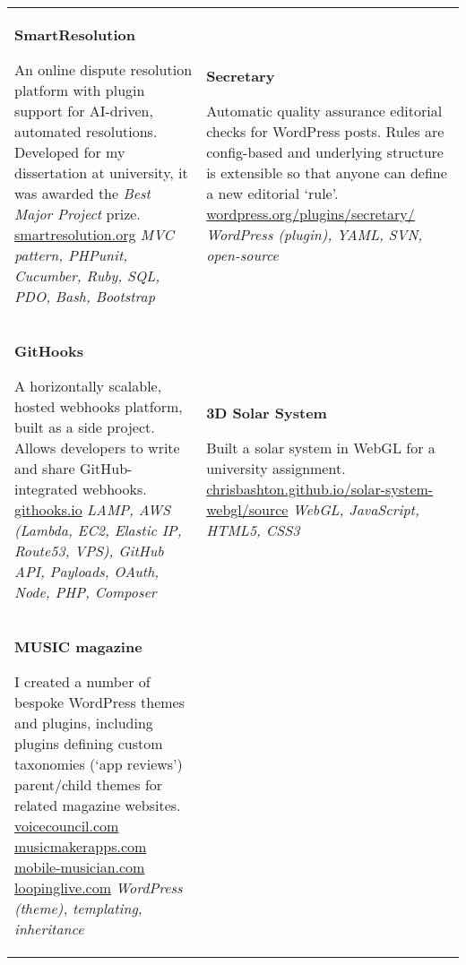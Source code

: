 \begin{tabular}{ p{21.4em} p{21.3em} } 

\textbf{SmartResolution}
\par{An online dispute resolution platform with plugin support for AI-driven, automated resolutions. Developed for my dissertation at university, it was awarded the \emph{Best Major Project} prize.}
\newline
\url{smartresolution.org}
\newline
\emph{MVC pattern, PHPunit, Cucumber, Ruby, SQL, PDO, Bash, Bootstrap}

&

\textbf{Secretary}
\par{Automatic quality assurance editorial checks for WordPress posts. Rules are config-based and underlying structure is extensible so that anyone can define a new editorial `rule'.}
\newline
\url{wordpress.org/plugins/secretary/}
\newline
\emph{WordPress (plugin), YAML, SVN, open-source}

\\

\textbf{GitHooks}
\par{A horizontally scalable, hosted webhooks platform, built as a side project. Allows developers to write and share GitHub-integrated webhooks.}
\newline
\url{githooks.io}
\newline
\emph{LAMP, AWS (Lambda, EC2, Elastic IP, Route53, VPS), GitHub API, Payloads, OAuth, Node, PHP, Composer}

&

\textbf{3D Solar System}
\par{Built a solar system in WebGL for a university assignment.}
\newline
\url{chrisbashton.github.io/solar-system-webgl/source}
\newline
\emph{WebGL, JavaScript, HTML5, CSS3}

\\

\textbf{MUSIC magazine}
\par{I created a number of bespoke WordPress themes and plugins, including plugins defining custom taxonomies (`app reviews') parent/child themes for related magazine websites.}
\newline
\url{voicecouncil.com}
\newline
\url{musicmakerapps.com}
\newline
\url{mobile-musician.com}
\newline
\url{loopinglive.com}
\newline
\emph{WordPress (theme), templating, inheritance}


\end{tabular}
